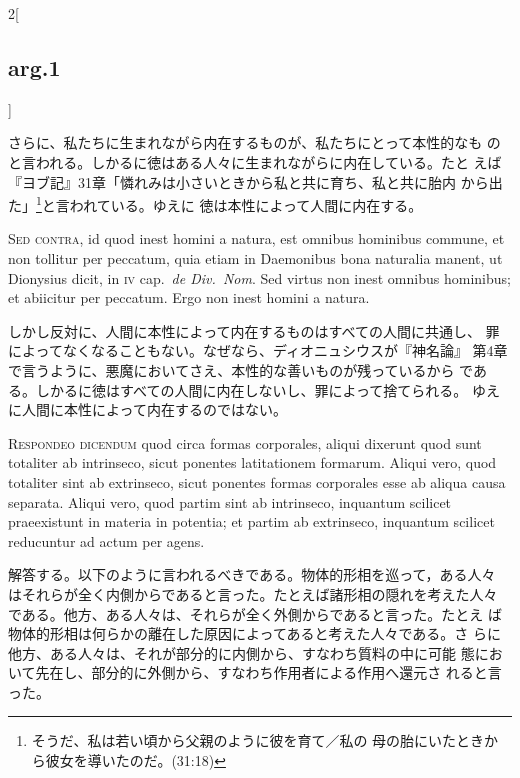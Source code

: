 \documentclass[paper=a4paper,fontsize=10pt,jafontsize=9pt,titlepage]{jlreq}
\begin{document}
\begin{paracol}{2}[\subsection{arg.1}]
\switchcolumn

さらに、私たちに生まれながら内在するものが、私たちにとって本性的なも
 のと言われる。しかるに徳はある人々に生まれながらに内在している。たと
 えば『ヨブ記』31章「憐れみは小さいときから私と共に育ち、私と共に胎内
 から出た」\footnote{そうだ、私は若い頃から父親のように彼を育て／私の
 母の胎にいたときから彼女を導いたのだ。(31:18)}と言われている。ゆえに
 徳は本性によって人間に内在する。

\switchcolumn*[\subsection{s.c.}]

{\scshape Sed contra}, id quod inest homini a natura, est omnibus
hominibus commune, et non tollitur per peccatum, quia etiam in
Daemonibus bona naturalia manent, ut Dionysius dicit, in {\scshape iv}
cap.~{\itshape de Div.~Nom}. Sed virtus non inest omnibus hominibus;
et abiicitur per peccatum. Ergo non inest homini a natura.

\switchcolumn

しかし反対に、人間に本性によって内在するものはすべての人間に共通し、
 罪によってなくなることもない。なぜなら、ディオニュシウスが『神名論』
 第4章で言うように、悪魔においてさえ、本性的な善いものが残っているから
 である。しかるに徳はすべての人間に内在しないし、罪によって捨てられる。
 ゆえに人間に本性によって内在するのではない。


{\scshape Respondeo dicendum} quod circa formas corporales, aliqui
 dixerunt quod sunt totaliter ab intrinseco, sicut ponentes
 latitationem formarum. Aliqui vero, quod totaliter sint ab
 extrinseco, sicut ponentes formas corporales esse ab aliqua causa
 separata. Aliqui vero, quod partim sint ab intrinseco, inquantum
 scilicet praeexistunt in materia in potentia; et partim ab
 extrinseco, inquantum scilicet reducuntur ad actum per agens.

\switchcolumn

解答する。以下のように言われるべきである。物体的形相を巡って，ある人々
 はそれらが全く内側からであると言った。たとえば諸形相の隠れを考えた人々
 である。他方、ある人々は、それらが全く外側からであると言った。たとえ
 ば物体的形相は何らかの離在した原因によってあると考えた人々である。さ
 らに他方、ある人々は、それが部分的に内側から、すなわち質料の中に可能
 態において先在し、部分的に外側から、すなわち作用者による作用へ還元さ
 れると言った。


\end{paracol}
\end{document}
